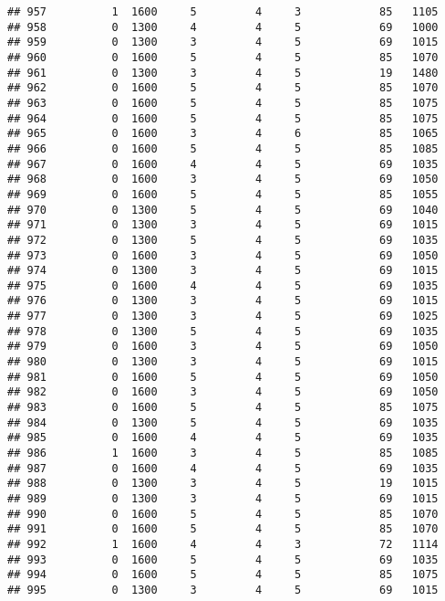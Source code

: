 \documentclass[]{article}
\begin{document}
\begin{verbatim}
## 957          1  1600     5         4     3            85   1105
## 958          0  1300     4         4     5            69   1000
## 959          0  1300     3         4     5            69   1015
## 960          0  1600     5         4     5            85   1070
## 961          0  1300     3         4     5            19   1480
## 962          0  1600     5         4     5            85   1070
## 963          0  1600     5         4     5            85   1075
## 964          0  1600     5         4     5            85   1075
## 965          0  1600     3         4     6            85   1065
## 966          0  1600     5         4     5            85   1085
## 967          0  1600     4         4     5            69   1035
## 968          0  1600     3         4     5            69   1050
## 969          0  1600     5         4     5            85   1055
## 970          0  1300     5         4     5            69   1040
## 971          0  1300     3         4     5            69   1015
## 972          0  1300     5         4     5            69   1035
## 973          0  1600     3         4     5            69   1050
## 974          0  1300     3         4     5            69   1015
## 975          0  1600     4         4     5            69   1035
## 976          0  1300     3         4     5            69   1015
## 977          0  1300     3         4     5            69   1025
## 978          0  1300     5         4     5            69   1035
## 979          0  1600     3         4     5            69   1050
## 980          0  1300     3         4     5            69   1015
## 981          0  1600     5         4     5            69   1050
## 982          0  1600     3         4     5            69   1050
## 983          0  1600     5         4     5            85   1075
## 984          0  1300     5         4     5            69   1035
## 985          0  1600     4         4     5            69   1035
## 986          1  1600     3         4     5            85   1085
## 987          0  1600     4         4     5            69   1035
## 988          0  1300     3         4     5            19   1015
## 989          0  1300     3         4     5            69   1015
## 990          0  1600     5         4     5            85   1070
## 991          0  1600     5         4     5            85   1070
## 992          1  1600     4         4     3            72   1114
## 993          0  1600     5         4     5            69   1035
## 994          0  1600     5         4     5            85   1075
## 995          0  1300     3         4     5            69   1015

\end{verbatim}
\end{document}
